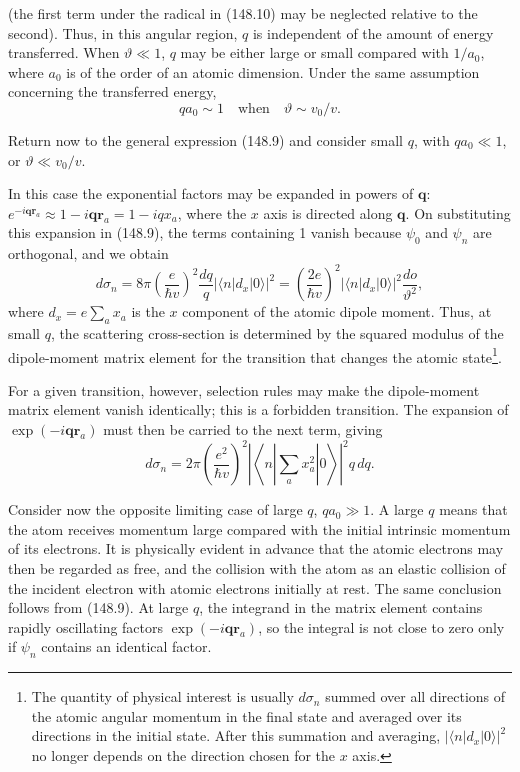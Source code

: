 (the first term under the radical in (148.10) may be neglected relative to the second). Thus, in this angular region, $q$ is independent of the amount of energy transferred. When $\vartheta\ll1$, $q$ may be either large or small compared with $1/a_0$, where $a_0$ is of the order of an atomic dimension. Under the same assumption concerning the transferred energy,
\begin{equation}
 qa_0\sim1\quad\text{when}\quad\vartheta\sim v_0/v.
 \tag{148.13}
\end{equation}

Return now to the general expression (148.9) and consider small $q$, with $qa_0\ll1$, or $\vartheta\ll v_0/v$.

In this case the exponential factors may be expanded in powers of $\mathbf q$:
$e^{-i\mathbf q\mathbf r_a}\approx1-i\mathbf q\mathbf r_a=1-iqx_a$, where the $x$ axis is directed along $\mathbf q$. On substituting this expansion in (148.9), the terms containing 1 vanish because $\psi_0$ and $\psi_n$ are orthogonal, and we obtain
\begin{equation}
 d\sigma_n=8\pi\left(\frac{e}{\hbar v}\right)^2\frac{dq}{q}|\langle n|d_x|0\rangle|^2
 =\left(\frac{2e}{\hbar v}\right)^2|\langle n|d_x|0\rangle|^2\frac{do}{\vartheta^2},
 \tag{148.14}
\end{equation}
where $d_x=e\sum_a x_a$ is the $x$ component of the atomic dipole moment. Thus, at small $q$, the scattering cross-section is determined by the squared modulus of the dipole-moment matrix element for the transition that changes the atomic state\footnote{The quantity of physical interest is usually $d\sigma_n$ summed over all directions of the atomic angular momentum in the final state and averaged over its directions in the initial state. After this summation and averaging, $|\langle n|d_x|0\rangle|^2$ no longer depends on the direction chosen for the $x$ axis.}.

For a given transition, however, selection rules may make the dipole-moment matrix element vanish identically; this is a forbidden transition. The expansion of $\exp(-i\mathbf q\mathbf r_a)$ must then be carried to the next term, giving
\begin{equation}
 d\sigma_n=2\pi\left(\frac{e^2}{\hbar v}\right)^2
 \left|\left\langle n\left|\sum_a x_a^2\right|0\right\rangle\right|^2q\,dq.
 \tag{148.15}
\end{equation}

Consider now the opposite limiting case of large $q$, $qa_0\gg1$. A large $q$ means that the atom receives momentum large compared with the initial intrinsic momentum of its electrons. It is physically evident in advance that the atomic electrons may then be regarded as free, and the collision with the atom as an elastic collision of the incident electron with atomic electrons initially at rest. The same conclusion follows from (148.9). At large $q$, the integrand in the matrix element contains rapidly oscillating factors $\exp(-i\mathbf q\mathbf r_a)$, so the integral is not close to zero only if $\psi_n$ contains an identical factor.

